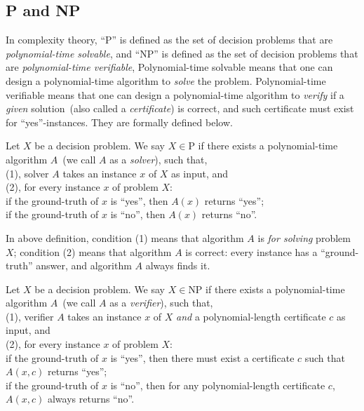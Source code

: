 \subsection*{P and NP}

In complexity theory, ``P'' is defined as the set of decision problems that are \emph{polynomial-time solvable}, 
and ``NP'' is defined as the set of decision problems that are \emph{polynomial-time verifiable}, 
Polynomial-time solvable means that one can design a polynomial-time algorithm to \emph{solve} the problem.
Polynomial-time verifiable means that one can design a polynomial-time algorithm to \emph{verify}
if a \emph{given} solution~(also called a \emph{certificate}) is correct,  
and such certificate must exist for ``yes''-instances.
They are formally defined below.


\begin{definition}[P]
Let $X$ be a decision problem. We say $X\in \textrm{P}$ if there exists a polynomial-time algorithm $A$~(we call $A$ as a \emph{solver}), such that,\\
	(1), solver $A$ takes an instance $x$ of $X$ as input, and \\
	(2), for every instance $x$ of problem $X$: \\
	\hspace*{0.2cm} if the ground-truth of $x$ is ``yes'', then $A(x)$ returns ``yes'';\\
	\hspace*{0.2cm} if the ground-truth of $x$ is ``no'', then $A(x)$ returns ``no''.
\end{definition}

In above definition, condition (1) means that algorithm $A$ is \emph{for solving} problem $X$;
condition (2) means that algorithm $A$ is correct: every instance has a ``ground-truth'' answer, and
algorithm $A$ always finds it.

\begin{definition}[NP]
Let $X$ be a decision problem. We say $X\in \textrm{NP}$ if there exists a polynomial-time algorithm $A$~(we call $A$ as a \emph{verifier}), such that,\\
	(1), verifier $A$ takes an instance $x$ of $X$ \emph{and} a polynomial-length certificate $c$ as input, and \\
	(2), for every instance $x$ of problem $X$: \\
	\hspace*{0.2cm} if the ground-truth of $x$ is ``yes'', then there must exist a certificate $c$ such that $A(x,c)$ returns ``yes'';\\
	\hspace*{0.2cm} if the ground-truth of $x$ is ``no'', then for any polynomial-length certificate $c$, $A(x,c)$ always returns ``no''.
\end{definition}

